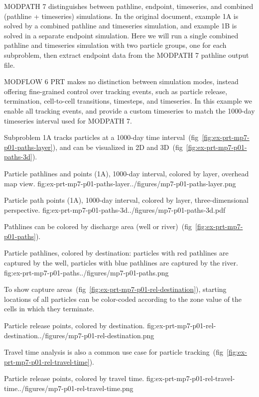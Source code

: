 MODPATH 7 distinguishes between pathline, endpoint, timeseries, and combined (pathline + timeseries) simulations. In the original document, example 1A is solved by a combined pathline and timeseries simulation, and example 1B is solved in a separate endpoint simulation. Here we will run a single combined pathline and timeseries simulation with two particle groups, one for each subproblem, then extract endpoint data from the MODPATH 7 pathline output file.

MODFLOW 6 PRT makes no distinction between simulation modes, instead offering fine-grained control over tracking events, such as particle release, termination, cell-to-cell transitions, timesteps, and timeseries. In this example we enable all tracking events, and provide a custom timeseries to match the 1000-day timeseries interval used for MODPATH 7.

Subproblem 1A tracks particles at a 1000-day time interval~(fig~\ref{fig:ex-prt-mp7-p01-paths-layer}), and can be visualized in 2D and 3D~(fig~\ref{fig:ex-prt-mp7-p01-paths-3d}).

\begin{StandardFigure}{
    Particle pathlines and points (1A), 1000-day interval, colored by layer, overhead map view.
    }{fig:ex-prt-mp7-p01-paths-layer}{../figures/mp7-p01-paths-layer.png}
\end{StandardFigure}

\begin{StandardFigure}{
    Particle path points (1A), 1000-day interval, colored by layer, three-dimensional perspective.
    }{fig:ex-prt-mp7-p01-paths-3d}{../figures/mp7-p01-paths-3d.pdf}
\end{StandardFigure}

Pathlines can be colored by discharge area (well or river)~(fig~\ref{fig:ex-prt-mp7-p01-paths}).

\begin{StandardFigure}{
    Particle pathlines, colored by destination: particles with red pathlines are captured by the well, particles with blue pathlines are captured by the river.
    }{fig:ex-prt-mp7-p01-paths}{../figures/mp7-p01-paths.png}
\end{StandardFigure}

To show capture areas~(fig~\ref{fig:ex-prt-mp7-p01-rel-destination}), starting locations of all particles can be color-coded according to the zone value of the cells in which they terminate.

\begin{StandardFigure}{
    Particle release points, colored by destination.
    }{fig:ex-prt-mp7-p01-rel-destination}{../figures/mp7-p01-rel-destination.png}
\end{StandardFigure}

Travel time analysis is also a common use case for particle tracking~(fig~\ref{fig:ex-prt-mp7-p01-rel-travel-time}).

\begin{StandardFigure}{
    Particle release points, colored by travel time.
    }{fig:ex-prt-mp7-p01-rel-travel-time}{../figures/mp7-p01-rel-travel-time.png}
\end{StandardFigure}